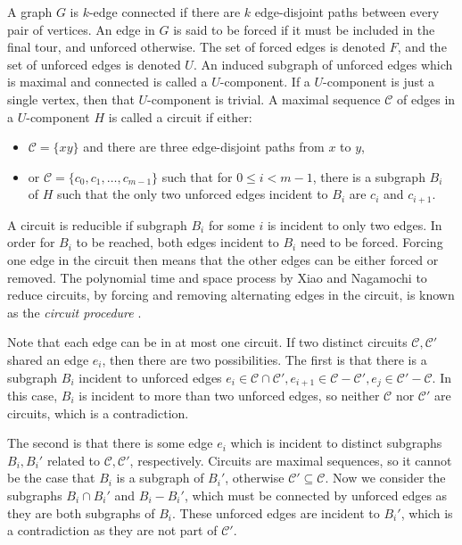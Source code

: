 A graph $G$ is $k$-edge connected if there are $k$ edge-disjoint paths between every pair of vertices. An edge in $G$ is said to be forced if it must be included in the final tour, and unforced otherwise. The set of forced edges is denoted $F$, and the set of unforced edges is denoted $U$. An induced subgraph of unforced edges which is maximal and connected is called a $U$-component. If a $U$-component is just a single vertex, then that $U$-component is trivial. A maximal sequence $\mathcal{C}$ of edges in a $U$-component $H$ is called a circuit if either:
%
\begin{itemize}
\item $\mathcal{C} = \{xy\}$ and there are three edge-disjoint paths from $x$ to $y$,
\item or $\mathcal{C} = \{c_0, c_1,\dots,c_{m-1}\}$ such that for $0 \leq i < m-1$, there is a subgraph $B_i$ of $H$ such that the only two unforced edges incident to $B_i$ are $c_i$ and $c_{i+1}$.
\end{itemize}
%

A circuit is reducible if subgraph $B_i$ for some $i$ is incident to only two edges. In order for $B_i$ to be reached, both edges incident to $B_i$ need to be forced. Forcing one edge in the circuit then means that the other edges can be either forced or removed. The polynomial time and space process by Xiao and Nagamochi to reduce circuits, by forcing and removing alternating edges in the circuit, is known as the {\em circuit procedure} \cite{xiao2016degree3}.

Note that each edge can be in at most one circuit. If two distinct circuits $\mathcal{C}, \mathcal{C}'$ shared an edge $e_i$, then there are two possibilities. The first is that there is a subgraph $B_i$ incident to unforced edges $e_i \in \mathcal{C} \cap \mathcal{C}', e_{i+1} \in \mathcal{C} - \mathcal{C}', e_j \in \mathcal{C}' - \mathcal{C}$. In this case, $B_i$ is incident to more than two unforced edges, so neither $\mathcal{C}$ nor $\mathcal{C}'$ are circuits, which is a contradiction.

The second is that there is some edge $e_i$ which is incident to distinct subgraphs $B_i, B_i'$ related to $\mathcal{C}, \mathcal{C}'$, respectively. Circuits are maximal sequences, so it cannot be the case that $B_i$ is a subgraph of $B_i'$, otherwise $\mathcal{C}' \subseteq \mathcal{C}$. Now we consider the subgraphs $B_i \cap B_i'$ and $B_i - B_i'$, which must be connected by unforced edges as they are both subgraphs of $B_i$. These unforced edges are incident to $B_i'$, which is a contradiction as they are not part of $\mathcal{C}'$.

